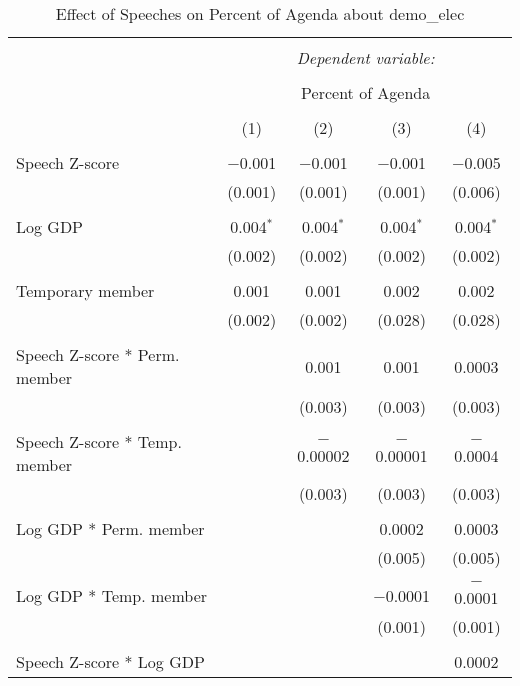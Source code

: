 
\begin{table}[!htbp] \centering 
  \caption{Effect of Speeches on Percent of Agenda about demo_elec} 
  \label{} 
\begin{tabular}{@{\extracolsep{5pt}}lcccc} 
\\[-1.8ex]\hline 
\hline \\[-1.8ex] 
 & \multicolumn{4}{c}{\textit{Dependent variable:}} \\ 
\cline{2-5} 
\\[-1.8ex] & \multicolumn{4}{c}{Percent of Agenda} \\ 
\\[-1.8ex] & (1) & (2) & (3) & (4)\\ 
\hline \\[-1.8ex] 
 Speech Z-score & $-$0.001 & $-$0.001 & $-$0.001 & $-$0.005 \\ 
  & (0.001) & (0.001) & (0.001) & (0.006) \\ 
  & & & & \\ 
 Log GDP & 0.004$^{*}$ & 0.004$^{*}$ & 0.004$^{*}$ & 0.004$^{*}$ \\ 
  & (0.002) & (0.002) & (0.002) & (0.002) \\ 
  & & & & \\ 
 Temporary member & 0.001 & 0.001 & 0.002 & 0.002 \\ 
  & (0.002) & (0.002) & (0.028) & (0.028) \\ 
  & & & & \\ 
 Speech Z-score * Perm. member &  & 0.001 & 0.001 & 0.0003 \\ 
  &  & (0.003) & (0.003) & (0.003) \\ 
  & & & & \\ 
 Speech Z-score * Temp. member &  & $-$0.00002 & $-$0.00001 & $-$0.0004 \\ 
  &  & (0.003) & (0.003) & (0.003) \\ 
  & & & & \\ 
 Log GDP * Perm. member &  &  & 0.0002 & 0.0003 \\ 
  &  &  & (0.005) & (0.005) \\ 
  & & & & \\ 
 Log GDP * Temp. member &  &  & $-$0.0001 & $-$0.0001 \\ 
  &  &  & (0.001) & (0.001) \\ 
  & & & & \\ 
 Speech Z-score * Log GDP &  &  &  & 0.0002 \\ 

\end{tabular}
\end{table}
